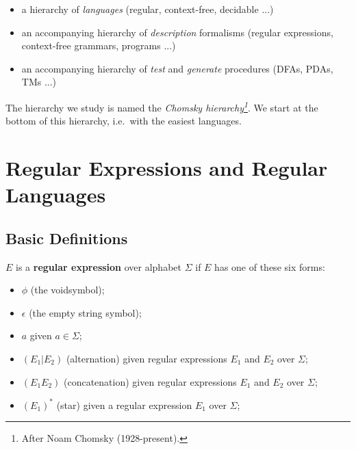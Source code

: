 \begin{itemize}
\item[] a hierarchy of \emph{languages} (regular, context-free, decidable ...)

\item[] an accompanying hierarchy of \emph{description} formalisms (regular expressions, context-free grammars, programs ...)

\item[] an accompanying hierarchy of {\em test} and {\em generate} procedures (DFAs, PDAs, TMs ...)
\end{itemize}

The hierarchy we study is named the {\em
Chomsky hierarchy\footnote{After Noam Chomsky (1928-present).}}. We start at the bottom of
this hierarchy, i.e.\ with the easiest languages.



\chapter{Regular Expressions and Regular Languages}

\section{Basic Definitions}

\begin{definition} \label{defregexp}
$E$ is a {\bf regular expression} over alphabet $\Sigma$ if $E$ has one of these six forms:
\begin{itemize}
	\item $\phi$ (the void\footnotemark symbol);
	\item $\epsilon$ (the empty string symbol);
	\item $a$ given $a \in \Sigma$;
	\item $(E_1 | E_2)$ (alternation) given regular expressions $E_1$ and $E_2$ over $\Sigma$;
	\item $(E_1E_2)$ (concatenation) given regular expressions $E_1$ and $E_2$ over $\Sigma$;
	\item $(E_1)^*$ (star) given a regular expression $E_1$ over $\Sigma$;
\end{itemize}
\end{definition}

